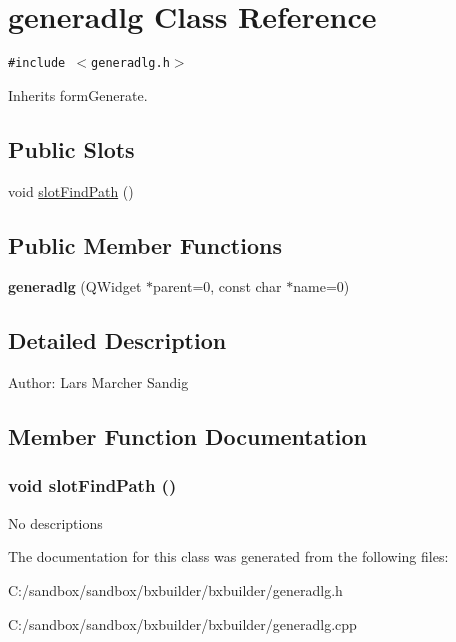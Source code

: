 \hypertarget{classgeneradlg}{
\section{generadlg Class Reference}
\label{classgeneradlg}
}
{\tt \#include $<$generadlg.h$>$}

Inherits formGenerate.

\subsection*{Public Slots}
\begin{CompactItemize}
\item 
void \hyperlink{classgeneradlg_35a8152ffe83982d2ebf28d607373933}{slotFindPath} ()
\end{CompactItemize}
\subsection*{Public Member Functions}
\begin{CompactItemize}
\item 
\hypertarget{classgeneradlg_b0b579e32bac5406d05d27c2adc0e2d3}{
\textbf{generadlg} (QWidget $\ast$parent=0, const char $\ast$name=0)}
\label{classgeneradlg_b0b579e32bac5406d05d27c2adc0e2d3}

\end{CompactItemize}


\subsection{Detailed Description}
\begin{Desc}
\item[Author:]Lars Marcher Sandig \end{Desc}


\subsection{Member Function Documentation}
\hypertarget{classgeneradlg_35a8152ffe83982d2ebf28d607373933}{
\subsubsection[{slotFindPath}]{\setlength{\rightskip}{0pt plus 5cm}void slotFindPath ()}}
\label{classgeneradlg_35a8152ffe83982d2ebf28d607373933}


No descriptions 

The documentation for this class was generated from the following files:\begin{CompactItemize}
\item 
C:/sandbox/sandbox/bxbuilder/bxbuilder/generadlg.h\item 
C:/sandbox/sandbox/bxbuilder/bxbuilder/generadlg.cpp\end{CompactItemize}
